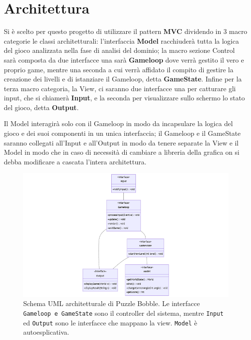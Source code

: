 \documentclass[a4paper,12pt]{report}
\begin{document}
\section{Architettura}

Si è scelto per questo progetto di utilizzare il pattern \textbf{MVC} dividendo in 3 macro  categorie le classi architetturali: 
l'interfaccia \textbf{Model} racchiuderà tutta la logica del gioco analizzata nella fase di analisi del dominio; la  macro sezione Control sarà composta da due interfacce una sarà \textbf{Gameloop} dove verrà gestito il vero e proprio game, mentre una seconda a cui verrà affidato il compito di gestire la creazione dei livelli e di istanziare il Gameloop, detta \textbf{GameState}. Infine per la terza macro categoria, la View, ci saranno due interfacce una per catturare gli input, che si chiamerà \textbf{Input}, e la seconda per visualizzare sullo schermo lo stato del gioco, detta \textbf{Output}.


Il Model interagirà solo con il Gameloop in modo da incapsulare la logica del gioco e dei suoi componenti  in un unica interfaccia; il Gameloop e il GameState saranno collegati all'Input e all'Output in modo da tenere separate la View e il Model in modo che in caso di necessità di cambiare a libreria della grafica on si debba modificare  a cascata l'intera architettura. 

\begin{figure}[H]
\centering{}
\includegraphics[width=\textwidth]{img/Diagramma_UML_Architettura}
\caption{Schema UML architetturale di Puzzle Bobble. Le interfacce \texttt{Gameloop e GameState} sono il controller del sistema, mentre \texttt{Input} ed \texttt{Output} sono le interfacce che mappano la view. \texttt{Model} è autoesplicativa.}
\label{img:Diagramma_UML_Architettura}
\end{figure}
\end{document}
